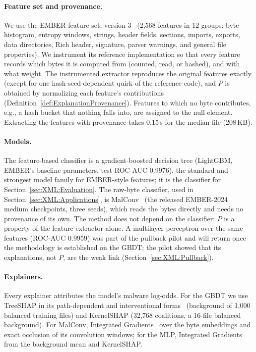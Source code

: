 \paragraph{Feature set and provenance.} We use the EMBER feature set, version 3~\cite{joyce2025ember} (2{,}568 features in 12 groups: byte histogram, entropy windows, strings, header fields, sections, imports, exports, data directories, Rich header, signature, parser warnings, and general file properties). We instrument its reference implementation so that every feature records which bytes it is computed from (counted, read, or hashed), and with what weight. The instrumented extractor reproduces the original features exactly (except for one hash-seed-dependent quirk of the reference code), and $P$ is obtained by normalizing each feature's contributions (Definition~\ref{def:ExplanationProvenance}). Features to which no byte contributes, e.g., a hash bucket that nothing falls into, are assigned to the null element. Extracting the features with provenance takes 0.15\,s for the median file (208\,KB).

\paragraph{Models.} The feature-based classifier is a gradient-boosted decision tree (LightGBM, EMBER's baseline parameters, test ROC-AUC 0.9976), the standard and strongest model family for EMBER-style features; it is the classifier for Section~\ref{sec:XML:Evaluation}. The raw-byte classifier, used in Section~\ref{sec:XML:Applications}, is MalConv~\cite{raff2018malware} (the released EMBER-2024 medium checkpoints, three seeds), which reads the bytes directly and needs no provenance of its own. The method does not depend on the classifier: $P$ is a property of the feature extractor alone. A multilayer perceptron over the same features (ROC-AUC 0.9959) was part of the pullback pilot and will return once the methodology is established on the GBDT; the pilot showed that its explanations, not $P$, are the weak link (Section~\ref{sec:XML:Pullback}).

\paragraph{Explainers.} Every explainer attributes the model's malware log-odds. For the GBDT we use TreeSHAP in its path-dependent and interventional forms~\cite{lundberg2017unified} (background of 1{,}000 balanced training files) and KernelSHAP (32{,}768 coalitions, a 16-file balanced background). For MalConv, Integrated Gradients~\cite{sundararajan2017axiomatic} over the byte embeddings and exact occlusion of its convolution windows; for the MLP, Integrated Gradients from the background mean and KernelSHAP.

